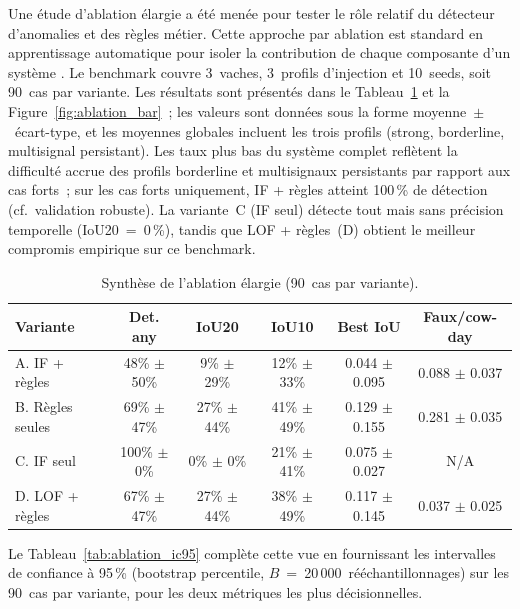 Une étude d'ablation élargie a été menée pour tester le rôle relatif du détecteur
d'anomalies et des règles métier. Cette approche par ablation est standard en apprentissage
automatique pour isoler la contribution de chaque composante d'un système
\citep{sklearn_api}. Le benchmark couvre 3~vaches, 3~profils d'injection
et 10~seeds, soit 90~cas par variante. Les résultats sont présentés dans le
Tableau~\ref{tab:ablation_global} et la Figure~\ref{fig:ablation_bar}~; les valeurs sont
données sous la forme moyenne~$\pm$~écart-type, et les moyennes globales incluent les
trois profils (strong, borderline, multisignal persistant). Les taux plus bas du
système complet reflètent la difficulté accrue des profils borderline et multisignaux
persistants par rapport aux cas forts~; sur les cas forts uniquement, IF + règles
atteint 100\,\% de détection (cf.\ validation robuste). La variante~C (IF seul) détecte
tout mais sans précision temporelle (IoU20~=~0\,\%), tandis que LOF + règles~(D)
obtient le meilleur compromis empirique sur ce benchmark.

\begin{table}[H]
    \centering
    \caption{Synthèse de l'ablation élargie (90~cas par variante).}
    \label{tab:ablation_global}
    \begin{tabular}{lccccc}
        \toprule
        \textbf{Variante} & \textbf{Det. any} & \textbf{IoU20} & \textbf{IoU10}
            & \textbf{Best IoU} & \textbf{Faux/cow-day} \\
        \midrule
        A. IF + règles      & 48\% $\pm$ 50\% & 9\% $\pm$ 29\%  & 12\% $\pm$ 33\%
            & 0.044 $\pm$ 0.095 & 0.088 $\pm$ 0.037 \\
        B. Règles seules    & 69\% $\pm$ 47\% & 27\% $\pm$ 44\% & 41\% $\pm$ 49\%
            & 0.129 $\pm$ 0.155 & 0.281 $\pm$ 0.035 \\
        C. IF seul          & 100\% $\pm$ 0\% & 0\% $\pm$ 0\%   & 21\% $\pm$ 41\%
            & 0.075 $\pm$ 0.027 & N/A \\
        D. LOF + règles     & 67\% $\pm$ 47\% & 27\% $\pm$ 44\% & 38\% $\pm$ 49\%
            & 0.117 $\pm$ 0.145 & 0.037 $\pm$ 0.025 \\
        \bottomrule
    \end{tabular}
\end{table}

Le Tableau~\ref{tab:ablation_ic95} complète cette vue en fournissant les intervalles de
confiance à 95\,\% (bootstrap percentile, $B$~=~20\,000~rééchantillonnages) sur les
90~cas par variante, pour les deux métriques les plus décisionnelles.

